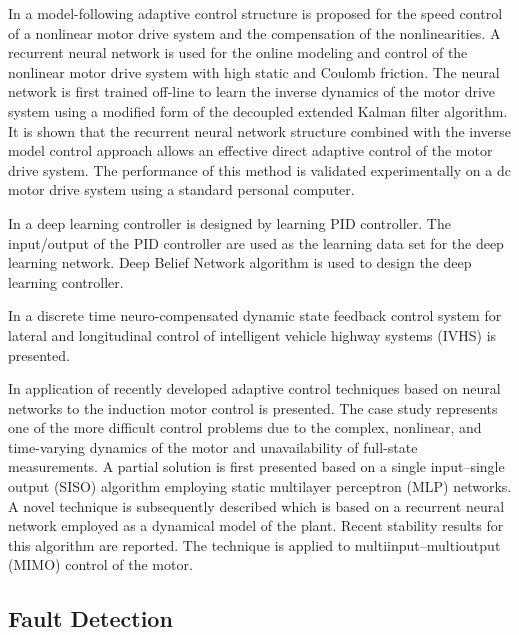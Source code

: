 \documentclass[conference]{IEEEtran}
\begin{document}
In \cite{nouri2008adaptive} a model-following adaptive control structure is proposed for the speed control of a nonlinear motor drive system and the compensation of the nonlinearities. A recurrent neural network is used for the online modeling and control of the nonlinear motor drive system with high static and Coulomb friction. The neural network is first trained off-line to learn the inverse dynamics of the motor drive system using a modified form of the decoupled extended Kalman filter algorithm. It is shown that the recurrent neural network structure combined with the inverse model control approach allows an effective direct adaptive control of the motor drive system. The performance of this method is validated experimentally on a dc motor drive system using a standard personal computer.

In \cite{aamir13pid} a deep learning controller is designed by learning PID controller. The input/output of the PID controller are used as the learning data set for the deep learning network. Deep Belief Network algorithm is used to design the deep learning controller.

In \cite{kumarawadu2010discrete-time} a discrete time neuro-compensated dynamic state feedback control system for  lateral and longitudinal control of intelligent vehicle highway systems (IVHS) is presented.

In \cite{brdys1999dynamic} application of recently developed adaptive control techniques based on neural networks to the induction motor control is presented. The case study represents one of the more difficult control problems due to the complex, nonlinear, and time-varying dynamics of the motor and unavailability of full-state measurements. A partial solution is first presented based on a single input–single output (SISO) algorithm employing static multilayer perceptron (MLP) networks. A novel technique is subsequently described which is based on a recurrent neural network employed as a dynamical model of the plant. Recent stability results for this algorithm are reported. The technique is applied to multiinput–multioutput (MIMO) control of the motor.


\subsection{Fault Detection}

\cite{meng2016safety, Shao2017, alicmotor, zhang2017fault, silva2013fault, murphey2006fault, murphey2006model, marko1991nips, kim2005nips}
\end{document}
